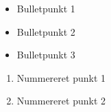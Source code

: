 \begin{itemize}
    \item Bulletpunkt 1
    \item Bulletpunkt 2
    \item Bulletpunkt 3
\end{itemize}

\begin{enumerate}
  \item Nummereret punkt 1
  \item Nummereret punkt 2
\end{enumerate}